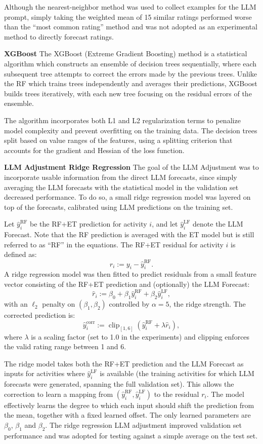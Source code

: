 \documentclass[12pt,a4paper]{article}
\begin{document}
Although the nearest-neighbor method was used to collect examples for the LLM prompt, simply taking the weighted mean of 15 similar ratings performed worse than the ``most common rating'' method and was not adopted as an experimental method to directly forecast ratings.

\textbf{XGBoost}
The XGBoost (Extreme Gradient Boosting) method is a statistical algorithm which constructs an ensemble of decision trees sequentially, where each subsequent tree attempts to correct the errors made by the previous trees. Unlike the RF which trains trees independently and averages their predictions, XGBoost builds trees iteratively, with each new tree focusing on the residual errors of the ensemble. 

The algorithm incorporates both L1 and L2 regularization terms to penalize model complexity and prevent overfitting on the training data. The decision trees split based on value ranges of the features, using a splitting criterion that accounts for the gradient and Hessian of the loss function.

\textbf{LLM Adjustment Ridge Regression}
\label{subsubsub:LLM_adjustment}
The goal of the LLM Adjustment was to incorporate usable information from the direct LLM forecasts, since simply averaging the LLM forecasts with the statistical model in the validation set decreased performance. To do so, a small ridge regression model was layered on top of the forecasts, calibrated using LLM predictions on the training set.

Let $\hat{y}^{\text{RF}}_i$ be the RF+ET prediction for activity $i$, and let $\hat{y}^{\text{LF}}_i$ denote the LLM Forecast. Note that the RF prediction is averaged with the ET model but is still referred to as ``RF'' in the equations. The RF+ET residual for activity $i$ is defined as:
\[
r_i := y_i - \hat{y}^{\text{RF}}_i .
\]
A ridge regression model was then fitted to predict residuals from a small feature vector consisting of the RF+ET prediction and (optionally) the LLM Forecast:
\[
\hat{r}_i := \beta_0 + \beta_1 \hat{y}^{\text{RF}}_i + \beta_2 \hat{y}^{\text{LF}}_i ,
\]
with an $\ell_2$ penalty on $(\beta_1,\beta_2)$ controlled by $\alpha = 5$, the ridge strength. The corrected prediction is:
\[
\hat{y}^{\text{corr}}_i := \operatorname{clip}_{[1,6]}\!\left(\hat{y}^{\text{RF}}_i + \lambda \hat{r}_i\right),
\]
where $\lambda$ is a scaling factor (set to 1.0 in the experiments) and clipping enforces the valid rating range between 1 and 6.

The ridge model takes both the RF+ET prediction and the LLM Forecast as inputs for activities where $\hat{y}^{\text{LF}}_i$ is available (the training activities for which LLM forecasts were generated, spanning the full validation set). This allows the correction to learn a mapping from $(\hat{y}^{\text{RF}}_i, \hat{y}^{\text{LF}}_i)$ to the residual $r_i$. The model effectively learns the degree to which each input should shift the prediction from the mean, together with a fixed learned offset. The only learned parameters are $\beta_0$, $\beta_1$ and $\beta_2$. The ridge regression LLM adjustment improved validation set performance and was adopted for testing against a simple average on the test set.
\end{document}
